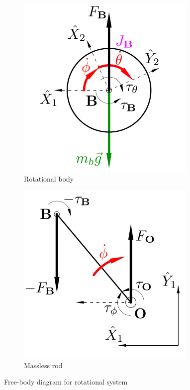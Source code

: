 \begin{figure}[htbp]
\centering
\begin{subfigure}{0.49\textwidth}
\centering
\includegraphics[width=\textwidth]{figs/lemma-a}
\caption{Rotational body}
\label{fig:lemma-a}
\end{subfigure}
\begin{subfigure}{0.49\textwidth}
\centering
\includegraphics[width=\textwidth]{figs/lemma-b}
\caption{Massless rod}
\label{fig:lemma-b}
\end{subfigure}
\caption{Free-body diagram for rotational system}
\label{fig:lemma}
\vspace{-10pt}
\end{figure}
